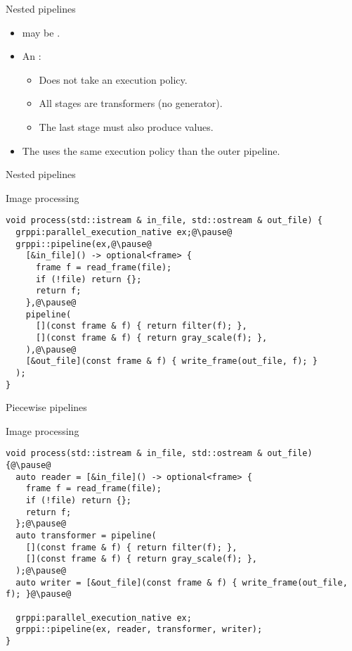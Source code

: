 \begin{frame}[t,fragile]{Nested pipelines}
\begin{itemize}
  \item {} may be .
  \vfill
  \item An :
    \begin{itemize}
      \item Does not take an execution policy.
      \item All stages are transformers (no generator).
      \item The last stage must also produce values.
    \end{itemize}
  \vfill
  \item The  uses the same execution policy than the outer
        pipeline.
\end{itemize}
\end{frame}

\begin{frame}[t,fragile]{Nested pipelines}
\begin{block}{Image processing}
\begin{lstlisting}[escapechar=@]
void process(std::istream & in_file, std::ostream & out_file) {
  grppi:parallel_execution_native ex;@\pause@
  grppi::pipeline(ex,@\pause@
    [&in_file]() -> optional<frame> {
      frame f = read_frame(file);
      if (!file) return {};
      return f;
    },@\pause@
    pipeline(
      [](const frame & f) { return filter(f); },
      [](const frame & f) { return gray_scale(f); },
    ),@\pause@
    [&out_file](const frame & f) { write_frame(out_file, f); }
  );
}
\end{lstlisting}
\end{block}
\end{frame}

\begin{frame}[t,fragile]{Piecewise pipelines}
\begin{block}{Image processing}
\begin{lstlisting}[escapechar=@]
void process(std::istream & in_file, std::ostream & out_file) {@\pause@
  auto reader = [&in_file]() -> optional<frame> {
    frame f = read_frame(file);
    if (!file) return {};
    return f;
  };@\pause@
  auto transformer = pipeline(
    [](const frame & f) { return filter(f); },
    [](const frame & f) { return gray_scale(f); },
  );@\pause@
  auto writer = [&out_file](const frame & f) { write_frame(out_file, f); }@\pause@

  grppi:parallel_execution_native ex;
  grppi::pipeline(ex, reader, transformer, writer);
}
\end{lstlisting}
\end{block}
\end{frame}
